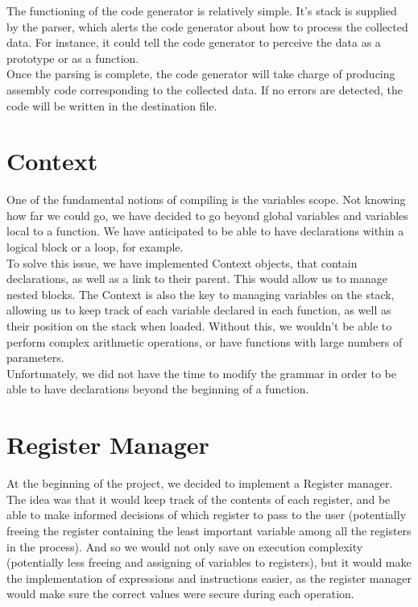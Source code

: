 \documentclass{scrartcl}
\begin{document}
The functioning of the code generator is relatively simple. It's stack is supplied by the parser, which alerts the code generator about how to process the collected data. For instance, it could tell the code generator to perceive the data as a prototype or as a function.\\
Once the parsing is complete, the code generator will take charge of producing assembly code corresponding to the collected data. If no errors are detected, the code will be written in the destination file.


\section{Context}
One of the fundamental notions of compiling is the variables scope. Not knowing how far we could go, we have decided to go beyond global variables and variables local to a function. We have anticipated to be able to have declarations within a logical block or a loop, for example.\\

To solve this issue, we have implemented Context objects, that contain declarations, as well as a link to their parent. This would allow us to manage nested blocks. The Context is also the key to managing variables on the stack, allowing us to keep track of each variable declared in each function, as well as their position on the stack when loaded. Without this, we wouldn't be able to perform complex arithmetic operations, or have functions with large numbers of parameters.\\

Unfortunately, we did not have the time to modify the grammar in order to be able to have declarations beyond the beginning of a function.


\section{Register Manager}
At the beginning of the project, we decided to implement a Register manager. The idea was that it would keep track of the contents of each register, and be able to make informed decisions of which register to pass to the user (potentially freeing the register containing the least important variable among all the registers in the process). And so we would not only save on execution complexity (potentially less freeing and assigning of variables to registers), but it would make the implementation of expressions and instructions easier, as the register manager would make sure the correct values were secure during each operation.\\
\end{document}
